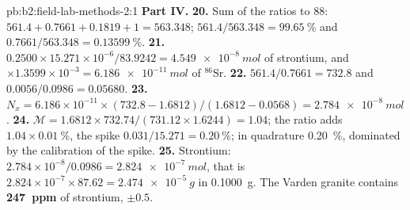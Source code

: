 \begin{solution}{pb:b2:field-lab-methods-2:1}
\noindent\textbf{Part IV.}
\textbf{20.} Sum of the ratios to 88: $561.4 + 0.7661 + 0.1819 + 1 = 563.348$; $561.4/563.348 =
\qty{99.65}{\percent}$ and $0.7661/563.348 = \qty{0.13599}{\percent}$.
\textbf{21.} $0.2500 \times 15.271 \times 10^{-6}/83.9242 = \qty{4.549e-8}{mol}$ of strontium, and
$\times 1.3599 \times 10^{-3} = \qty{6.186e-11}{mol}$ of $^{86}\mathrm{Sr}$.
\textbf{22.} $561.4/0.7661 = 732.8$ and $0.0056/0.0986 = 0.05680$.
\textbf{23.} $N_x = 6.186 \times 10^{-11} \times (732.8 - 1.6812)/(1.6812 - 0.0568) =
\qty{2.784e-8}{mol}$.
\textbf{24.} $\mathcal M = 1.6812 \times 732.74/(731.12 \times 1.6244) = 1.04$; the ratio adds
$1.04 \times \qty{0.01}{\percent}$, the spike $0.031/15.271 = \qty{0.20}{\percent}$; in quadrature
\qty{0.20}{\percent}, dominated by the calibration of the spike.
\textbf{25.} Strontium: $2.784 \times 10^{-8}/0.0986 = \qty{2.824e-7}{mol}$, that is $2.824 \times
10^{-7} \times 87.62 = \qty{2.474e-5}{g}$ in \qty{0.1000}{g}. The Varden granite contains
\textbf{\qty[text-series-to-math=true]{247}{ppm}} of strontium, $\pm 0.5$.
\end{solution}
